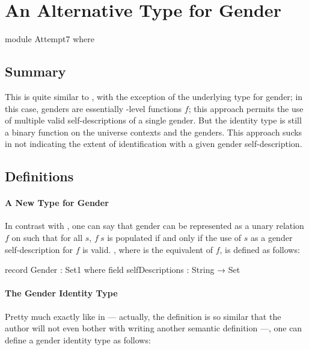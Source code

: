 \documentclass{article}
\theoremstyle{remark}
\begin{document}
\section{An Alternative Type for Gender}\label{sec:gender7}

\begin{code}
module Attempt7 where
\end{code}

\subsection{Summary}
This  is quite similar to \hyperref[sec:gender6]{}, with the exception of the underlying type for gender; in this case, genders are essentially -level functions \(f\); this approach permits the use of multiple valid self-descriptions of a single gender.  But the identity type is still a binary function on the universe contexts and the genders.  This approach sucks in not indicating the extent of identification with a given gender self-description.

\subsection{Definitions}
\paragraph{A New Type for Gender}
In contrast with , one can say that gender can be represented as a unary relation \(f\) on  such that for all \(s\), \(f\ s\) is populated if and only if the use of \(s\) as a gender self-description for \(f\) is valid.  , where  is the equivalent of \(f\), is defined as follows:

\begin{code}
  record Gender : Set1 where
    field
      selfDescriptions : String → Set
\end{code}

\paragraph{The Gender Identity Type}
Pretty much exactly like in  --- actually, the definition is so similar that the author will not even bother with writing another semantic definition ---, one can define a gender identity type  as follows:
\end{document}
